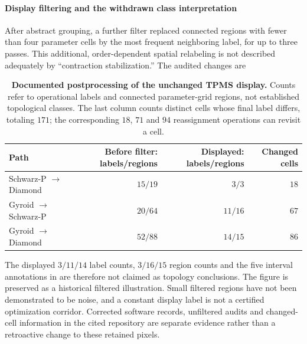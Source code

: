 \paragraph{Display filtering and the withdrawn class interpretation}
After abstract grouping, a further filter replaced connected regions with fewer than four parameter cells by the most frequent neighboring label, for up to three passes. This additional, order-dependent spatial relabeling is not described adequately by ``contraction stabilization.'' The audited changes are
\begin{table}[!t]
\centering\small
\begin{tabular}{lrrr}
\hline
Path & Before filter: labels/regions & Displayed: labels/regions & Changed cells\\\hline
Schwarz-P $\to$ Diamond & $15/19$ & $3/3$ & $18$\\
Gyroid $\to$ Schwarz-P & $20/64$ & $11/16$ & $67$\\
Gyroid $\to$ Diamond & $52/88$ & $14/15$ & $86$\\\hline
\end{tabular}
\caption{\textbf{Documented postprocessing of the unchanged TPMS display.} Counts refer to operational labels and connected parameter-grid regions, not established topological classes. The last column counts distinct cells whose final label differs, totaling $171$; the corresponding $18$, $71$ and $94$ reassignment operations can revisit a cell.}
\label{supptab:tpms_filter}
\end{table}

The displayed $3/11/14$ label counts, $3/16/15$ region counts and the five interval annotations in  are therefore not claimed as topology conclusions. The figure is preserved as a historical filtered illustration. Small filtered regions have not been demonstrated to be noise, and a constant display label is not a certified optimization corridor. Corrected software records, unfiltered audits and changed-cell information in the cited repository are separate evidence rather than a retroactive change to these retained pixels.

